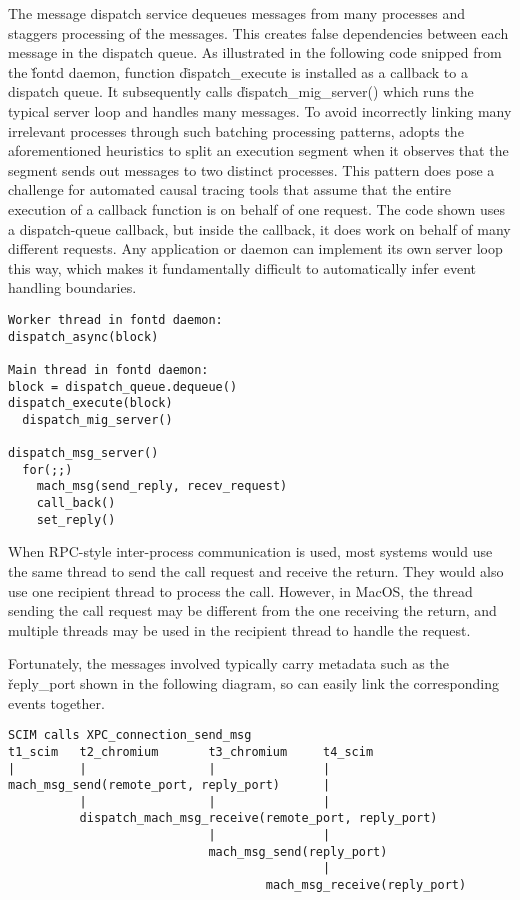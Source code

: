 The message dispatch service dequeues messages from many processes and staggers
processing of the messages. This creates false dependencies between each
message in the dispatch queue.  As illustrated in the following code snipped
from the \v{fontd} daemon, function \v{dispatch\_execute} is installed as a
callback to a dispatch queue.  It subsequently calls
\v{dispatch\_mig\_server()} which runs the typical server loop and handles many
messages.
To avoid incorrectly linking many irrelevant processes through such
batching processing patterns, \xxx adopts the aforementioned heuristics to
split an execution segment when it observes that the segment sends out messages
to two distinct processes.
This pattern does pose a challenge for automated causal tracing tools that
assume that the entire execution of a callback function is on behalf of one
request.  The code shown uses a dispatch-queue callback, but inside the
callback, it does work on behalf of many different requests.  Any application
or daemon can implement its  own server loop this way, which makes it
fundamentally difficult to automatically infer event handling boundaries.

{\footnotesize \begin{verbatim}
Worker thread in fontd daemon:
dispatch_async(block)

Main thread in fontd daemon:
block = dispatch_queue.dequeue()
dispatch_execute(block)
  dispatch_mig_server()

dispatch_msg_server()
  for(;;)
    mach_msg(send_reply, recev_request)
    call_back()
    set_reply()
\end{verbatim}
}

When RPC-style inter-process communication is used, most systems would use the
same thread to send the call request and receive the return.  They would also
use one recipient thread to process the call.  However, in MacOS, the thread
sending the call request may be different from the one receiving the return,
and multiple threads may be used in the recipient thread to handle the request.

Fortunately, the messages involved typically carry metadata such as the
\v{reply\_port} shown in the following diagram, so \xxx can easily link the
corresponding events together.

{\footnotesize \begin{verbatim}
SCIM calls XPC_connection_send_msg
t1_scim   t2_chromium       t3_chromium     t4_scim
|         |                 |               |
mach_msg_send(remote_port, reply_port)      |
          |                 |               |
          dispatch_mach_msg_receive(remote_port, reply_port)
                            |               |
                            mach_msg_send(reply_port)
                                            |
                                    mach_msg_receive(reply_port)

\end{verbatim}
}

